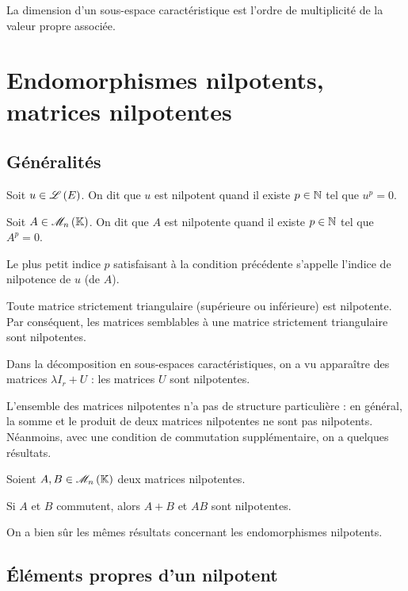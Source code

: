 \begin{cor}
La dimension d'un sous-espace caractéristique est l'ordre de multiplicité de la valeur propre associée.
\end{cor}

\section{Endomorphismes nilpotents, matrices nilpotentes}

\subsection{Généralités}

\begin{defi}
Soit \(u\in\mathscr{L}\left(E\right)\). On dit que \(u\) est nilpotent quand il existe \(p\in\mathbb{N}\) tel que \(u^p=0\).

Soit \(A\in\M{n}\). On dit que \(A\) est nilpotente quand il existe \(p\in\mathbb{N}\) tel que \(A^p=0\).

Le plus petit indice \(p\) satisfaisant à la condition précédente s'appelle l'indice de nilpotence de \(u\) (de \(A\)).
\end{defi}

\begin{prop}
Toute matrice strictement triangulaire (supérieure ou inférieure) est nilpotente. Par conséquent, les matrices semblables à une matrice strictement triangulaire sont nilpotentes.
\end{prop}

Dans la décomposition en sous-espaces caractéristiques, on a vu apparaître des matrices \(\lambda I_r+U\) : les matrices \(U\) sont nilpotentes.

L'ensemble des matrices nilpotentes n'a pas de structure particulière : en général, la somme et le produit de deux matrices nilpotentes ne sont pas nilpotents. Néanmoins, avec une condition de commutation supplémentaire, on a quelques résultats.

\begin{prop}
Soient \(A,B\in\M{n}\) deux matrices nilpotentes.

Si \(A\) et \(B\) commutent, alors \(A+B\) et \(AB\) sont nilpotentes.
\end{prop}

On a bien sûr les mêmes résultats concernant les endomorphismes nilpotents.

\subsection{Éléments propres d'un nilpotent}

